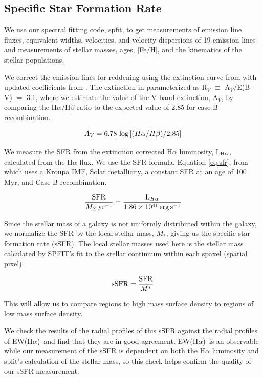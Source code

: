 \documentclass[iop,revtex4,twocolumn,apj,numberedappendix,appendixfloats]{emulateapj}
\newcommand{\ewha}{EW(H$\alpha$)}
\begin{document}
\subsection{Specific Star Formation Rate}

We use our spectral fitting code, {\sc spfit}, to get measurements of emission line fluxes, equivalent widths, velocities, and velocity dispersions of 19 emission lines and measurements of stellar masses, ages, [Fe/H], and the kinematics of the stellar populations. 

We correct the emission lines for reddening using the extinction curve from \citet{Cardelli:1989} with updated coefficients from \citet{ODonnell:1994}. The extinction in parameterized as R$_V$ $\equiv$ A$_V$/E(B$-$V) $=$ 3.1, where we estimate the value of the V-band extinction, A$_V$, by comparing the H$\alpha$/H$\beta$ ratio to the expected value of 2.85 for case-B recombination. 

\begin{equation}
A_V = 6.78\ {\rm log} \left[(H\alpha/H\beta)/2.85 \right]
\end{equation}

We measure the SFR from the extinction corrected H$\alpha$ luminosity, L$_{{\rm H}\alpha}$, calculated from the H$\alpha$ flux.  We use the SFR formula, Equation \ref{eq:sfr}, from \citet{Murphy:2011} which uses a Kroupa IMF, Solar metallicity, a constant SFR at an age of 100 Myr, and Case-B recombination. 

\begin{equation}\label{eq:sfr}
\frac{\rm{SFR}}{M_{\odot} \, \rm{yr^{-1}}} = \frac{{\rm L}_{H\alpha}}{1.86 \times 10^{41}\, \rm{erg\,s}^{-1}}
\end{equation}

Since the stellar mass of a galaxy is not uniformly distributed within the galaxy, we normalize the SFR by the local stellar mass, $M_*$, giving us the specific star formation rate (sSFR). The local stellar masses used here is the stellar mass calculated by {\sc SPFIT}'s fit to the stellar continuum within each spaxel (spatial pixel).

\begin{equation}
{\rm sSFR} = \frac{\rm SFR}{M^*}
\end{equation}

This will allow us to compare regions to high mass surface density to regions of low mass surface density. 

We check the results of the radial profiles of this sSFR against the radial profiles of \ewha\ and find that they are in good agreement. \ewha\ is an observable while our measurement of the sSFR is dependent on both the H$\alpha$ luminosity and {\sc spfit}'s calculation of the stellar mass, so this check helps confirm the quality of our sSFR measurement.
\end{document}
